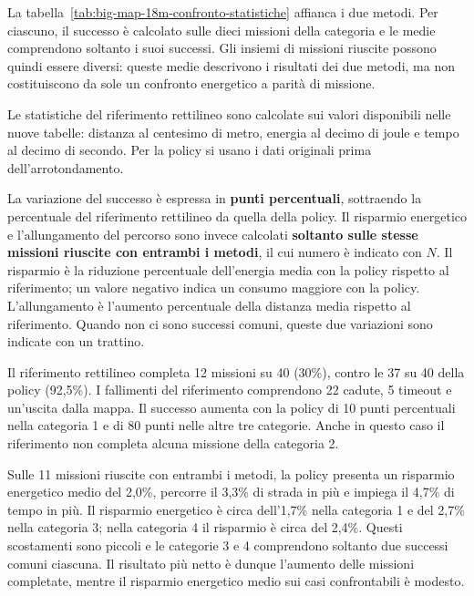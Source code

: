 \documentclass[11pt,a4paper]{article}
\begin{document}


La tabella~\ref{tab:big-map-18m-confronto-statistiche} affianca i due metodi. Per ciascuno, il successo è calcolato sulle dieci missioni della categoria e le medie comprendono soltanto i suoi successi. Gli insiemi di missioni riuscite possono quindi essere diversi: queste medie descrivono i risultati dei due metodi, ma non costituiscono da sole un confronto energetico a parità di missione.

Le statistiche del riferimento rettilineo sono calcolate sui valori disponibili nelle nuove tabelle: distanza al centesimo di metro, energia al decimo di joule e tempo al decimo di secondo. Per la policy si usano i dati originali prima dell'arrotondamento.



La variazione del successo è espressa in \textbf{punti percentuali}, sottraendo la percentuale del riferimento rettilineo da quella della policy. Il risparmio energetico e l'allungamento del percorso sono invece calcolati \textbf{soltanto sulle stesse missioni riuscite con entrambi i metodi}, il cui numero è indicato con $N$. Il risparmio è la riduzione percentuale dell'energia media con la policy rispetto al riferimento; un valore negativo indica un consumo maggiore con la policy. L'allungamento è l'aumento percentuale della distanza media rispetto al riferimento. Quando non ci sono successi comuni, queste due variazioni sono indicate con un trattino.



Il riferimento rettilineo completa 12 missioni su 40 (30\%), contro le 37 su 40 della policy (92,5\%). I fallimenti del riferimento comprendono 22 cadute, 5 timeout e un'uscita dalla mappa. Il successo aumenta con la policy di 10 punti percentuali nella categoria 1 e di 80 punti nelle altre tre categorie. Anche in questo caso il riferimento non completa alcuna missione della categoria 2.

Sulle 11 missioni riuscite con entrambi i metodi, la policy presenta un risparmio energetico medio del 2,0\%, percorre il 3,3\% di strada in più e impiega il 4,7\% di tempo in più. Il risparmio energetico è circa dell'1,7\% nella categoria 1 e del 2,7\% nella categoria 3; nella categoria 4 il risparmio è circa del 2,4\%. Questi scostamenti sono piccoli e le categorie 3 e 4 comprendono soltanto due successi comuni ciascuna. Il risultato più netto è dunque l'aumento delle missioni completate, mentre il risparmio energetico medio sui casi confrontabili è modesto.
\end{document}
